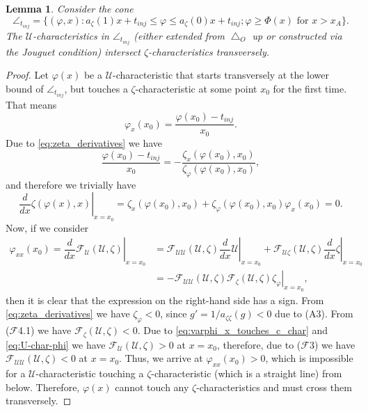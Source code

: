\documentclass[12pt]{article}
\newtheorem{lemma}{Lemma}
\theoremstyle{definition}
\begin{document}
\begin{lemma}
\label{lemma:transverse_intersect}
Consider the cone 
\begin{equation*}
\angle_{t_{inj}} = \{(\varphi, x)\colon a_\zeta(1)x + t_{inj} \leqslant \varphi \leqslant a_\zeta(0)x + t_{inj}; \varphi \geqslant \Phi(x) \text{ for } x>x_A\}.
\end{equation*}
The $\mathcal U$-characteristics in $\angle_{t_{inj}}$ (either extended from $\bigtriangleup_O$ up or constructed via the Jouguet condition) intersect $\zeta$-characteristics transversely.
\end{lemma}
\begin{proof}
Let $\varphi(x)$ be a $\mathcal U$-cha\-rac\-te\-ris\-tic that starts transversely at the lower bound of $\angle_{t_{inj}}$, but touches a $\zeta$-characteristic at some point $x_0$ for the first time. That means 
\begin{equation}\label{eq:varphi_x_touches_c_char}
\varphi_x(x_0) = \dfrac{\varphi(x_0) - t_{inj}}{x_0}.
\end{equation}
Due to \eqref{eq:zeta_derivatives} we have
\[
\dfrac{\varphi(x_0) - t_{inj}}{x_0} = -\dfrac{\zeta_x(\varphi(x_0), x_0)}{\zeta_\varphi(\varphi(x_0), x_0)},
\]
and therefore we trivially have
\[
\left.\dfrac{d}{dx} \zeta(\varphi(x), x) \right|_{x=x_0} = \zeta_x(\varphi(x_0), x_0) + \zeta_\varphi(\varphi(x_0), x_0)\varphi_x(x_0) = 0.
\]
Now, if we consider
\begin{align*}
\varphi_{xx}(x_0) = \left.\dfrac{d}{dx} \mathcal F_{\mathcal U}(\mathcal U, \zeta) \right|_{x=x_0} &=
\left. \mathcal F_{\mathcal U\mathcal U}(\mathcal U, \zeta) \dfrac{d}{dx} \mathcal U\right|_{x=x_0} + \left.\mathcal F_{\mathcal U\zeta}(\mathcal U, \zeta) \dfrac{d}{dx} \zeta \right|_{x=x_0}\\
{} &= - \left. \mathcal F_{\mathcal U\mathcal U}(\mathcal U, \zeta) \mathcal F_\zeta(\mathcal U, \zeta) \zeta_\varphi \right|_{x=x_0}, 
\end{align*}
then it is clear that the expression on the right-hand side has a sign. From \eqref{eq:zeta_derivatives} we have $\zeta_\varphi < 0$, since $g' = 1/a_{\zeta\zeta}(g) < 0$ due to (A3). From ($\mathcal{F}$4.1) we have $\mathcal F_\zeta(\mathcal U, \zeta) < 0$. 
Due to \eqref{eq:varphi_x_touches_c_char} and \eqref{eq:U-char-phi} we have $\mathcal F_{\mathcal U}(\mathcal U, \zeta) > 0$ at $x = x_0$, therefore, due to ($\mathcal{F} 3$) we have $\mathcal F_{\mathcal U\mathcal U}(\mathcal U, \zeta) < 0$ at $x=x_0$. 
Thus, we arrive at $\varphi_{xx}(x_0) > 0$, which is impossible for a $\mathcal U$-characteristic touching a $\zeta$-characteristic (which is a straight line) from below. Therefore, $\varphi(x)$ cannot touch any $\zeta$-characteristics and must cross them transversely.
\end{proof}
\end{document}
